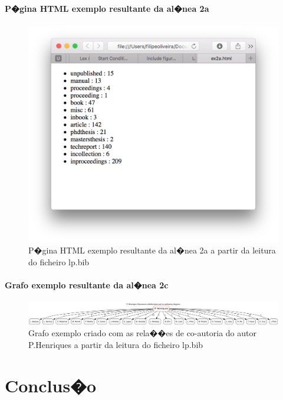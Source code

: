 \documentclass{report}
\begin{document}
    \subsubsection{P�gina HTML exemplo resultante da al�nea 2a }
    \begin{figure}[H]
      \centering
      \includegraphics[width=0.5\columnwidth]{PNG/ex2a}
    \caption{P�gina HTML exemplo resultante da al�nea 2a a partir da leitura do ficheiro lp.bib}
    \label{fig:ex2a}
    \end{figure}

    \subsubsection{Grafo exemplo resultante da al�nea 2c}
    \begin{figure}[H]
      \centering
      \includegraphics[width=\columnwidth]{PNG/ex2c}
    \caption{Grafo exemplo criado com as rela��es de co-autoria do autor P.Henriques a partir da leitura do ficheiro lp.bib}
    \label{fig:ex2c}
    \end{figure}






    \chapter{Conclus�o} \label{concl}
\end{document}
